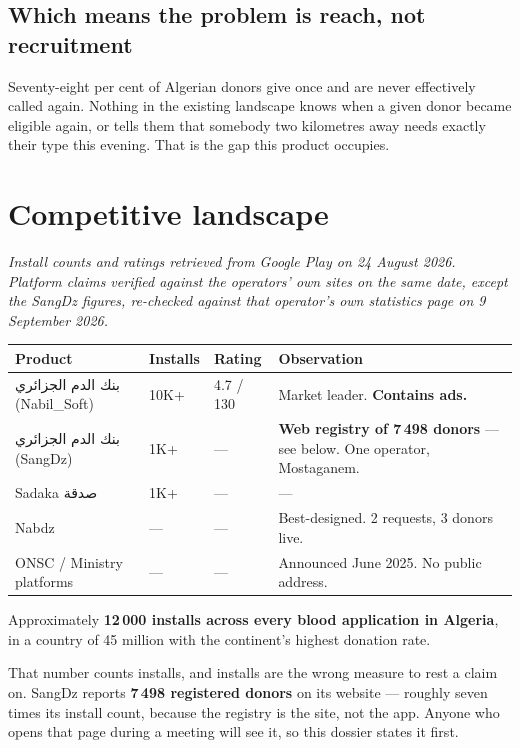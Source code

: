 \documentclass[11pt,a4paper]{article}
\newcommand{\ar}[1]{\textarabic{#1}}
\newcommand{\note}[1]{{\small\color{qatraGrey}\textit{#1}}}
\begin{document}
\subsection{Which means the problem is reach, not recruitment}

Seventy-eight per cent of Algerian donors give once and are never effectively
called again. Nothing in the existing landscape knows when a given donor became
eligible again, or tells them that somebody two kilometres away needs exactly
their type this evening. That is the gap this product occupies.

\section{Competitive landscape}

\note{Install counts and ratings retrieved from Google Play on 24 August 2026.
Platform claims verified against the operators' own sites on the same date,
except the SangDz figures, re-checked against that operator's own statistics
page on 9 September 2026.}

\begin{center}
\begin{tabularx}{\textwidth}{@{}lllX@{}}
\toprule
\textbf{Product} & \textbf{Installs} & \textbf{Rating} & \textbf{Observation} \\
\midrule
\ar{بنك الدم الجزائري} (Nabil\_Soft) & 10K+ & 4.7 / 130 & Market leader. \textbf{Contains ads.} \\
\ar{بنك الدم الجزائري} (SangDz) & 1K+ & — & \textbf{Web registry of 7\,498
donors} — see below. One operator, Mostaganem. \\
Sadaka \ar{صدقة} & 1K+ & — & — \\
Nabdz & — & — & Best-designed. 2 requests, 3 donors live. \\
ONSC / Ministry platforms & — & — & Announced June 2025. No public address. \\
\bottomrule
\end{tabularx}
\end{center}

Approximately \textbf{12\,000 installs across every blood application in
Algeria}, in a country of 45 million with the continent's highest donation rate.

That number counts installs, and installs are the wrong measure to rest a claim
on. SangDz reports \textbf{7\,498 registered donors} on its website — roughly
seven times its install count, because the registry is the site, not the app.
Anyone who opens that page during a meeting will see it, so this dossier states
it first.
\end{document}
